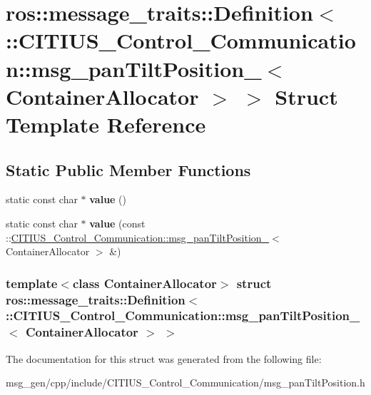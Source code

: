 \hypertarget{structros_1_1message__traits_1_1_definition_3_01_1_1_c_i_t_i_u_s___control___communication_1_1ms9c5206f8a24c68c3d36b39d1b892b4b8}{\section{ros\-:\-:message\-\_\-traits\-:\-:\-Definition$<$ \-:\-:\-C\-I\-T\-I\-U\-S\-\_\-\-Control\-\_\-\-Communication\-:\-:msg\-\_\-pan\-Tilt\-Position\-\_\-$<$ \-Container\-Allocator $>$ $>$ \-Struct \-Template \-Reference}
\label{structros_1_1message__traits_1_1_definition_3_01_1_1_c_i_t_i_u_s___control___communication_1_1ms9c5206f8a24c68c3d36b39d1b892b4b8}
}
\subsection*{\-Static \-Public \-Member \-Functions}
\begin{DoxyCompactItemize}
\item 
\hypertarget{structros_1_1message__traits_1_1_definition_3_01_1_1_c_i_t_i_u_s___control___communication_1_1ms9c5206f8a24c68c3d36b39d1b892b4b8_afeff8d7724fe2287405204cd7c398767}{static const char $\ast$ {\bfseries value} ()}\label{structros_1_1message__traits_1_1_definition_3_01_1_1_c_i_t_i_u_s___control___communication_1_1ms9c5206f8a24c68c3d36b39d1b892b4b8_afeff8d7724fe2287405204cd7c398767}

\item 
\hypertarget{structros_1_1message__traits_1_1_definition_3_01_1_1_c_i_t_i_u_s___control___communication_1_1ms9c5206f8a24c68c3d36b39d1b892b4b8_a2844628806d17756c19a6d6105ba2982}{static const char $\ast$ {\bfseries value} (const \-::\hyperlink{struct_c_i_t_i_u_s___control___communication_1_1msg__pan_tilt_position__}{\-C\-I\-T\-I\-U\-S\-\_\-\-Control\-\_\-\-Communication\-::msg\-\_\-pan\-Tilt\-Position\-\_\-}$<$ \-Container\-Allocator $>$ \&)}\label{structros_1_1message__traits_1_1_definition_3_01_1_1_c_i_t_i_u_s___control___communication_1_1ms9c5206f8a24c68c3d36b39d1b892b4b8_a2844628806d17756c19a6d6105ba2982}

\end{DoxyCompactItemize}
\subsubsection*{template$<$class Container\-Allocator$>$ struct ros\-::message\-\_\-traits\-::\-Definition$<$ \-::\-C\-I\-T\-I\-U\-S\-\_\-\-Control\-\_\-\-Communication\-::msg\-\_\-pan\-Tilt\-Position\-\_\-$<$ Container\-Allocator $>$ $>$}



\-The documentation for this struct was generated from the following file\-:\begin{DoxyCompactItemize}
\item 
msg\-\_\-gen/cpp/include/\-C\-I\-T\-I\-U\-S\-\_\-\-Control\-\_\-\-Communication/msg\-\_\-pan\-Tilt\-Position.\-h\end{DoxyCompactItemize}
